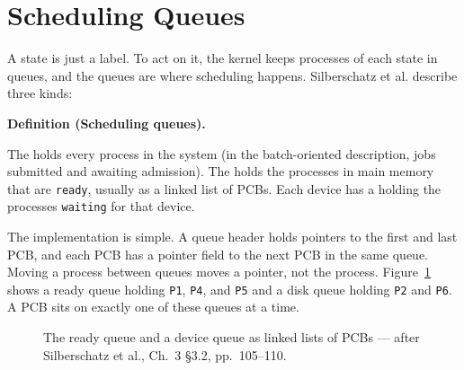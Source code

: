\documentclass[11pt]{article}
\newenvironment{definitionbox}[1]{%
  \par\noindent\textbf{Definition (#1).}\ \itshape
}{\par\vspace{0.3em}}
\begin{document}
\section{Scheduling Queues}
\label{sec:queues}

\noindent{}

A state is just a label. To act on it, the kernel keeps processes of each state
in queues, and the queues are where scheduling happens. Silberschatz et al.
describe three kinds:

\begin{definitionbox}{Scheduling queues}
The  holds every process in the system (in the batch-oriented
description, jobs submitted and awaiting admission). The 
holds the processes in main memory that are \texttt{ready}, usually as a
linked list of PCBs. Each device has a  holding the
processes \texttt{waiting} for that device.
\end{definitionbox}

The implementation is simple. A queue header holds pointers to the first and
last PCB, and each PCB has a pointer field to the next PCB in the same queue.
Moving a process between queues moves a pointer, not the process.
Figure~\ref{fig:lists} shows a ready queue holding \texttt{P1}, \texttt{P4},
and \texttt{P5} and a disk queue holding \texttt{P2} and \texttt{P6}. A PCB
sits on exactly one of these queues at a time.

\begin{figure}[h]
\centering
{}
\caption{The ready queue and a device queue as linked lists of PCBs --- after
Silberschatz et al., Ch.~3 \S3.2, pp.~105--110.}
\label{fig:lists}
\end{figure}
\end{document}
